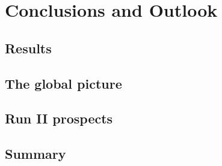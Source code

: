 \chapter{Conclusions and Outlook}
\section{Results}
\section{The global picture}
\section{Run II prospects}
\section{Summary}
